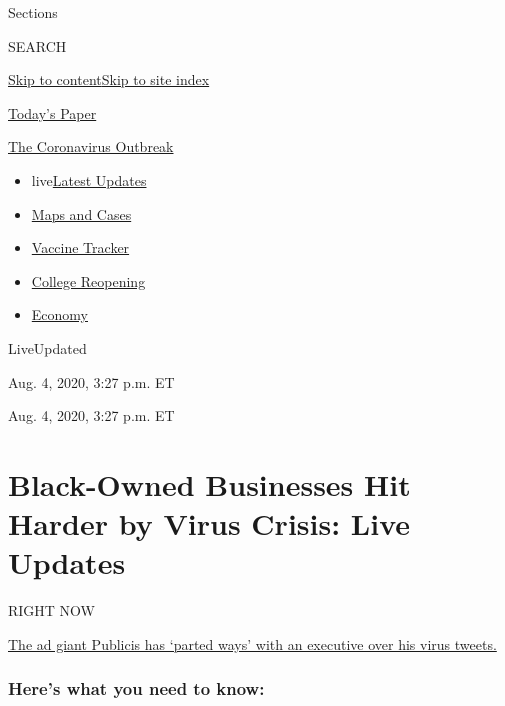 Sections

SEARCH

\protect\hyperlink{site-content}{Skip to
content}\protect\hyperlink{site-index}{Skip to site index}

\href{https://myaccount.nytimes3xbfgragh.onion/auth/login?response_type=cookie\&client_id=vi}{}

\href{https://www.nytimes3xbfgragh.onion/section/todayspaper}{Today's
Paper}

\href{https://www.nytimes3xbfgragh.onion/news-event/coronavirus}{The
Coronavirus Outbreak}

\begin{itemize}
\tightlist
\item
  live\href{https://www.nytimes3xbfgragh.onion/2020/08/04/world/coronavirus-cases.html}{Latest
  Updates}
\item
  \href{https://www.nytimes3xbfgragh.onion/interactive/2020/us/coronavirus-us-cases.html}{Maps
  and Cases}
\item
  \href{https://www.nytimes3xbfgragh.onion/interactive/2020/science/coronavirus-vaccine-tracker.html}{Vaccine
  Tracker}
\item
  \href{https://www.nytimes3xbfgragh.onion/2020/08/02/us/covid-college-reopening.html}{College
  Reopening}
\item
  \href{https://www.nytimes3xbfgragh.onion/live/2020/08/04/business/stock-market-today-coronavirus}{Economy}
\end{itemize}

LiveUpdated~

Aug. 4, 2020, 3:27 p.m. ET

Aug. 4, 2020, 3:27 p.m. ET

\hypertarget{black-owned-businesses-hit-harder-by-virus-crisis-live-updates}{%
\section{Black-Owned Businesses Hit Harder by Virus Crisis: Live
Updates}\label{black-owned-businesses-hit-harder-by-virus-crisis-live-updates}}

RIGHT NOW

\protect\hyperlink{the-ad-giant-publicis-has-parted-ways-with-an-executive-over-his-virus-tweets}{The
ad giant Publicis has `parted ways' with an executive over his virus
tweets.}

\hypertarget{heres-what-you-need-to-know}{%
\subsubsection{Here's what you need to
know:}\label{heres-what-you-need-to-know}}

